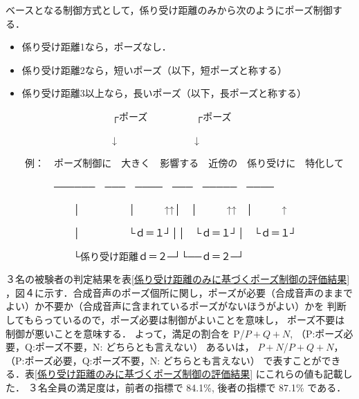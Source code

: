    ベースとなる制御方式として，係り受け距離のみから次のようにポーズ制御する．

   \begin{itemize}
     \item 係り受け距離1なら，ポーズなし．
     \item 係り受け距離2なら，短いポーズ（以下，短ポーズと称する）
     \item 係り受け距離3以上なら，長いポーズ（以下，長ポーズと称する）
   \end{itemize}
   \begin{table}

　　　　　　　　　　　┌ポーズ　　　　　┌ポーズ
\vspace{-2mm}

　　　　　　　　　　　↓　　　　　　　　↓
\vspace{-2mm}

　　例：　ポーズ制御に　大きく　影響する　近傍の　係り受けに　特化して
\vspace{-2mm}

　　　　　──────　───　────　───　─────　────
\vspace{-2mm}

　　　　　　　│　　　　　│　　　↑↑│　│　　　↑↑　│　　　↑
\vspace{-2mm}

　　　　　　　│　　　　　└ｄ＝１┘││　└ｄ＝１┘│　└ｄ＝１┘
\vspace{-2mm}

　　　　　　　└係り受け距離ｄ＝２─┘└──ｄ＝２─┘
   \end{table}


   ３名の被験者の判定結果を表\ref{係り受け距離のみに基づくポーズ制御の評価結果}
   ，図４に示す．合成音声のポーズ個所に関し，ポーズが必要（合成音声のままで
   よい）か不要か（合成音声に含まれているポーズがないほうがよい）かを
   判断してもらっているので，ポーズ必要は制御がよいことを意味し，
   ポーズ不要は制御が悪いことを意味する．
   よって，満足の割合を
	P/\(P+Q+N\),     （P:ポーズ必要，Q:ポーズ不要，N: どちらとも言えない）
   あるいは，
	\(P+N\)/\(P+Q+N\)，（P:ポーズ必要，Q:ポーズ不要，N: どちらとも言えない）
   で表すことができる．表\ref{係り受け距離のみに基づくポーズ制御の評価結果}
   にこれらの値も記載した．
   ３名全員の満足度は，前者の指標で 84.1\%, 後者の指標で 87.1\% である．

